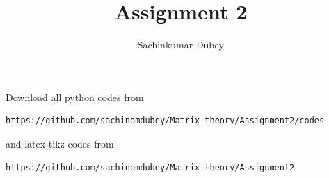 \documentclass[journal,12pt,twocolumn]{IEEEtran}
\begin{document}
\renewcommand{\thefigure}{\theproblem}

\def\putbox#1#2#3{\makebox[0in][l]{\makebox[#1][l]{}\raisebox{\baselineskip}[0in][0in]{\raisebox{#2}[0in][0in]{#3}}}}
     \def\rightbox#1{\makebox[0in][r]{#1}}
     \def\centbox#1{\makebox[0in]{#1}}
     \def\topbox#1{\raisebox{-\baselineskip}[0in][0in]{#1}}
     \def\midbox#1{\raisebox{-0.5\baselineskip}[0in][0in]{#1}}
\vspace{3cm}
\title{Assignment 2}
\author{Sachinkumar Dubey}

\maketitle
\newpage

\bigskip
\renewcommand{\thefigure}{\theenumi}
\renewcommand{\thetable}{\theenumi}
Download all python codes from 
\begin{lstlisting}
https://github.com/sachinomdubey/Matrix-theory/Assignment2/codes
\end{lstlisting}
%
and latex-tikz codes from 
%
\begin{lstlisting}
https://github.com/sachinomdubey/Matrix-theory/Assignment2
\end{lstlisting}
%
\end{document}
